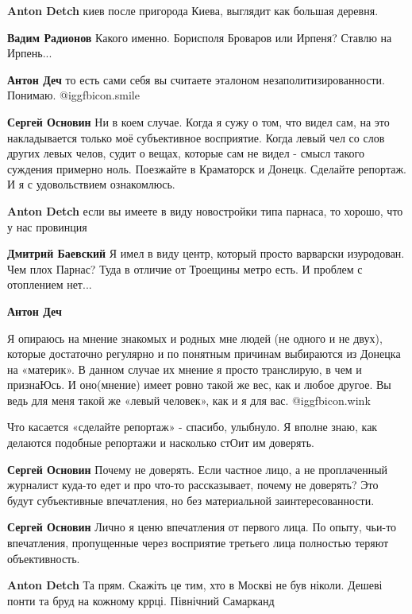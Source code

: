 \begin{itemize}
\begin{itemize}
\textbf{Anton Detch} киев после пригорода Киева, выглядит как большая деревня.

\textbf{Вадим Радионов} Какого именно. Борисполя Броваров или Ирпеня?
Ставлю на Ирпень...

\textbf{Антон Деч} то есть сами себя вы считаете эталоном незаполитизированности. Понимаю.  @igg{fbicon.smile} 

\textbf{Сергей Основин} Ни в коем случае. Когда я сужу о том, что видел сам, на это накладывается только моё субъективное восприятие.
Когда левый чел со слов других левых челов, судит о вещах, которые сам не видел - смысл такого суждения примерно ноль.
Поезжайте в Краматорск и Донецк. Сделайте репортаж. И я с удовольствием ознакомлюсь.

\textbf{Anton Detch} если вы имеете в виду новостройки типа парнаса, то хорошо, что у нас провинция

\textbf{Дмитрий Баевский} Я имел в виду центр, который просто варварски изуродован.
Чем плох Парнас? Туда в отличие от Троещины метро есть. И проблем с отоплением нет...

\textbf{Антон Деч} 

Я опираюсь на мнение знакомых и родных мне людей (не одного и не двух), которые
достаточно регулярно и по понятным причинам выбираются из Донецка на «материк».
В данном случае их мнение я просто транслирую, в чем и признаЮсь. И оно(мнение)
имеет ровно такой же вес, как и любое другое. Вы ведь для меня такой же «левый
человек», как и я для вас.  @igg{fbicon.wink} 

Что касается «сделайте репортаж» - спасибо, улыбнуло. Я вполне знаю, как
делаются подобные репортажи и насколько стОит им доверять.


\textbf{Сергей Основин} Почему не доверять. Если частное лицо, а не проплаченный журналист куда-то едет и про что-то рассказывает, почему не доверять?
Это будут субъективные впечатления, но без материальной заинтересованности.

\textbf{Сергей Основин} Лично я ценю впечатления от первого лица. По опыту, чьи-то впечатления, пропущенные через восприятие третьего лица полностью теряют объективность.

\textbf{Anton Detch} Та прям. Скажіть це тим, хто в Москві не був ніколи. Дешеві понти та бруд на кожному кррці. Північний Самарканд


\end{itemize}
\end{itemize}

